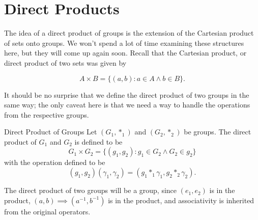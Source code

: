 \section{Direct Products}
The idea of a direct product of groups is the extension of the Cartesian product of sets onto groups. We won't spend a lot of time examining these structures here, but they will come up again soon. Recall that the Cartesian product, or direct product of two sets was given by

\[
    A\times B=\{(a,b):a\in A\land b\in B\}.
\]

\noindent It should be no surprise that we define the direct product of two groups in the same way; the only caveat here is that we need a way to handle the operations from the respective groups.

\begin{definition}{Direct Product of Groups}
    Let $(G_{1},*_{1})$ and $(G_{2},*_{2})$ be groups. The direct product of $G_{1}$ and $G_{2}$ is defined to be
    \[
        G_{1}\times G_{2}=\{(g_{1},g_{2}): g_{1}\in G_{2}\land G_{2}\in g_{2}\}
    \]
    with the operation defined to be
    \[
        (g_{1},g_{2})(\gamma_{1},\gamma_{2})=(g_{1}*_{1}\gamma_{1},g_{2}*_{2}\gamma_{2}).
    \]
\end{definition}
The direct product of two groups will be a group, since $(e_{1},e_{2})$ is in the product, $(a,b)\implies (a^{-1},b^{-1})$ is in the product, and associativity is inherited from the original operators. 
